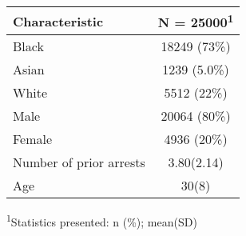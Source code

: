 \captionsetup[table]{labelformat=empty,skip=1pt}
\begin{longtable}{lc}
\toprule
\textbf{Characteristic} & \textbf{N = 25000}\textsuperscript{1} \\ 
\midrule
Black & 18249 (73\%) \\ 
Asian & 1239 (5.0\%) \\ 
White & 5512 (22\%) \\ 
Male & 20064 (80\%) \\ 
Female & 4936 (20\%) \\ 
Number of prior arrests & 3.80(2.14) \\ 
Age & 30(8) \\ 
\bottomrule
\end{longtable}
\vspace{-5mm}
\begin{minipage}{\linewidth}
\textsuperscript{1}Statistics presented: n (\%); mean(SD) \\ 
\end{minipage}

